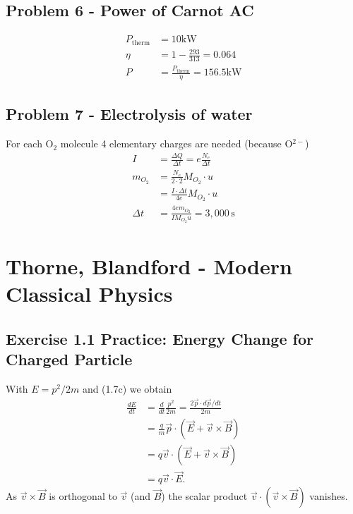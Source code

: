 \documentclass[10pt,a4paper]{book}
\theoremstyle{definition}
\begin{document}
\subsection{Problem 6 - Power of Carnot AC}
\begin{align}
P_\text{therm}&=10\text{kW}\\
\eta&=1-\frac{293}{313}=0.064\\
P&=\frac{P_\text{therm}}{\eta}=156.5\text{kW}
\end{align}


\subsection{Problem 7 - Electrolysis of water}
For each O$_2$ molecule 4 elementary charges are needed (because O$^{2-}$)
\begin{align}
I&=\frac{\Delta Q}{\Delta t}=e\frac{N_e}{\Delta t}\\
m_{O_2}
&=\frac{N_e}{2\cdot 2}M_{O_2}\cdot u\\
&=\frac{I\cdot\Delta t}{4e}M_{O_2}\cdot u\\
\Delta t&=\frac{4em_{O_2}}{IM_{O_2}u}=3,000\,\text{s}
\end{align}


\section{{\sc Thorne, Blandford} - Modern Classical Physics}
\subsection{Exercise 1.1 Practice: Energy Change for Charged Particle}
With $E=p^2/2m$ and (1.7c) we obtain
\begin{align}
    \frac{dE}{dt}&=\frac{d}{dt}\frac{p^2}{2m}=\frac{2 \vec{p}\cdot d\vec{p}/dt}{2m}\\
    &=\frac{q}{m}\vec{p}\cdot (\vec{E}+\vec{v}\times\vec{B})\\
    &=q\vec{v}\cdot (\vec{E}+\vec{v}\times\vec{B})\\
    &=q\vec{v}\cdot\vec{E}.
\end{align}
As $\vec{v}\times\vec{B}$ is orthogonal to $\vec{v}$ (and $\vec{B}$) the scalar product $\vec{v}\cdot(\vec{v}\times\vec{B})$ vanishes.
\end{document}
